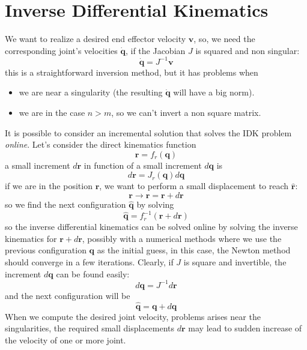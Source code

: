 \documentclass[10pt, letterpaper]{report}
\begin{document}
\section{Inverse Differential Kinematics}
We want to realize a desired end effector velocity $\mathbf v$, so, we need the corresponding joint's  velocities $\dot{\mathbf q}$, if the Jacobian $J$ is squared and non singular:\begin{equation}
    \dot{\mathbf q}=J^{-1}\mathbf v
\end{equation}
this is a straightforward inversion method, but it has problems when\begin{itemize}
    \item we are near a singularity (the resulting $\dot{\mathbf q}$ will have a big norm).
    \item we are in the case $n>m$, so we can't invert a non square matrix. 
\end{itemize}
It is possible to consider an incremental solution that solves the IDK problem \textit{online}. Let's consider the direct kinematics function\begin{equation}
    \mathbf r = f_r(\mathbf q)
\end{equation}
a small increment $d\mathbf r$ in function of a small increment $d\mathbf q$ is\begin{equation}
    d\mathbf r=J_r(\mathbf q)d\mathbf q
\end{equation}
if we are in the position $\mathbf r$, we want to perform a small displacement to reach $\hat{\mathbf r}$:\begin{equation}
    \mathbf r\longrightarrow \hat{\mathbf r}=\mathbf r+d\mathbf r
\end{equation}
so we find the next configuration $\hat{\mathbf q}$ by solving\begin{equation}
    \hat{\mathbf q}=f_r^{-1}(\mathbf r+d\mathbf r)
\end{equation}
so the inverse differential kinematics can be solved online by solving the inverse kinematics for $\mathbf r+d\mathbf r$, possibly with a numerical methods where we use the previous configuration $\mathbf q$ as the initial guess, in this case, the Newton method should converge in a few iterations.
Clearly, if $J$ is square and invertible, the increment $d\mathbf q$ can be found easily:\begin{equation}
    d\mathbf q = J^{-1}d\mathbf r
\end{equation}
and the next configuration will be \begin{equation}
      \hat{\mathbf q}=\mathbf q+d\mathbf q
\end{equation}
When we compute the desired joint velocity, problems arises near the singularities, the required small displacements $d\mathbf r$ may lead to sudden increase of the velocity of one or more joint.\bigskip
\end{document}
